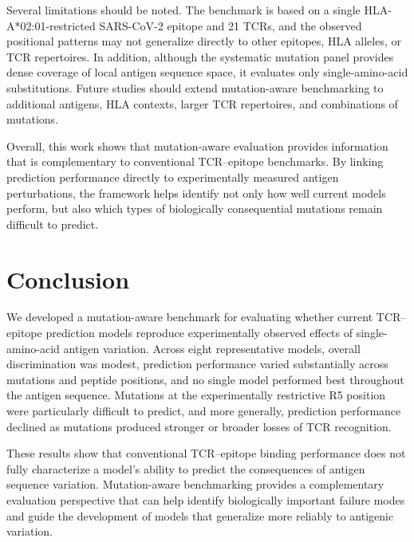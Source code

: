 \documentclass{article}
\begin{document}
Several limitations should be noted. The benchmark is based on a single HLA-A*02:01-restricted SARS-CoV-2 epitope and 21 TCRs, and the observed positional patterns may not generalize directly to other epitopes, HLA alleles, or TCR repertoires. In addition, although the systematic mutation panel provides dense coverage of local antigen sequence space, it evaluates only single-amino-acid substitutions. Future studies should extend mutation-aware benchmarking to additional antigens, HLA contexts, larger TCR repertoires, and combinations of mutations.

Overall, this work shows that mutation-aware evaluation provides information that is complementary to conventional TCR--epitope benchmarks. By linking prediction performance directly to experimentally measured antigen perturbations, the framework helps identify not only how well current models perform, but also which types of biologically consequential mutations remain difficult to predict.

\section{Conclusion}

We developed a mutation-aware benchmark for evaluating whether current
TCR--epitope prediction models reproduce experimentally observed effects of
single-amino-acid antigen variation. Across eight representative models,
overall discrimination was modest, prediction performance varied substantially
across mutations and peptide positions, and no single model performed best
throughout the antigen sequence. Mutations at the experimentally restrictive
R5 position were particularly difficult to predict, and more generally,
prediction performance declined as mutations produced stronger or broader
losses of TCR recognition.

These results show that conventional TCR--epitope binding performance does
not fully characterize a model's ability to predict the consequences of
antigen sequence variation. Mutation-aware benchmarking provides a
complementary evaluation perspective that can help identify biologically
important failure modes and guide the development of models that generalize
more reliably to antigenic variation.

 
\end{document}
